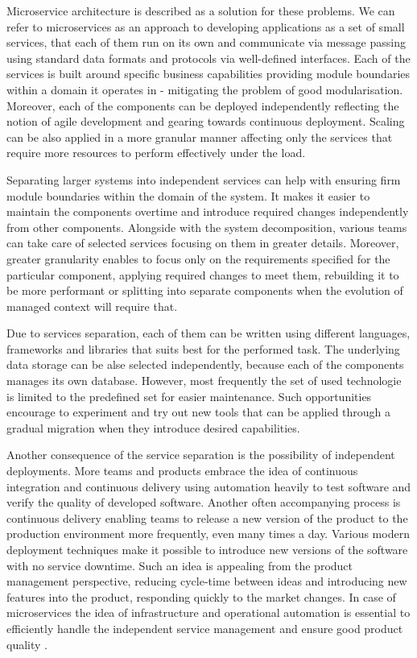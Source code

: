 Microservice architecture is described as a solution for these problems. We can refer to microservices as an approach to developing applications as a set of small services, that each of them run on its own and communicate via message passing using standard data formats and protocols via well-defined interfaces. Each of the services is built around specific business capabilities providing module boundaries within a domain it operates in - mitigating the problem of good modularisation. Moreover, each of the components can be deployed independently reflecting the notion of agile development and gearing towards continuous deployment. Scaling can be also applied in a more granular manner affecting only the services that require more resources to perform effectively under the load. \cite{FowlerMicroservices}

Separating larger systems into independent services can help with ensuring firm module boundaries within the domain of the system. It makes it easier to maintain the components overtime and introduce required changes independently from other components. Alongside with the system decomposition, various teams can take care of selected services focusing on them in greater details. Moreover, greater granularity enables to focus only on the requirements specified for the particular component, applying required changes to meet them, rebuilding it to be more performant or splitting into separate components when the evolution of managed context will require that.

Due to services separation, each of them can be written using different languages, frameworks and libraries that suits best for the performed task. The underlying data storage can be alse selected independently, because each of the components manages its own database. However, most frequently the set of used technologie is limited to the predefined set for easier maintenance. Such opportunities encourage to experiment and try out new tools that can be applied through a gradual migration when they introduce desired capabilities.

Another consequence of the service separation is the possibility of independent deployments. More teams and products embrace the idea of continuous integration and continuous delivery using automation heavily to test software and verify the quality of developed software. Another often accompanying process is continuous delivery enabling teams to release a new version of the product to the production environment more frequently, even many times a day. Various modern deployment techniques make it possible to introduce new versions of the software with no service downtime. Such an idea is appealing from the product management perspective, reducing cycle-time between ideas and introducing new features into the product, responding quickly to the market changes. In case of microservices the idea of infrastructure and operational automation is essential to efficiently handle the independent service management and ensure good product quality \cite{FowlerMicroservicesTradeoffs}.

